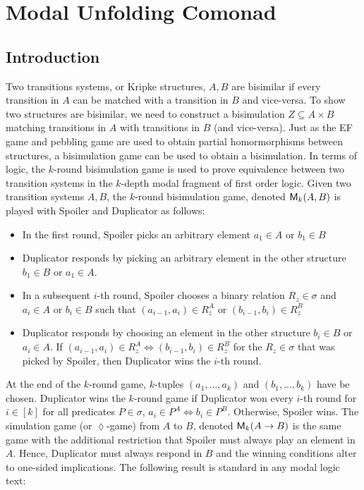 \chapter{Modal Unfolding Comonad}
\section{Introduction}
Two transitions systems, or Kripke structures, $A,B$ are bisimilar if every transition in $A$ can be matched with a transition in $B$ and vice-versa. To show two structures are bisimilar, we need to construct a bisimulation $Z \subseteq A \times B$ matching transitions in $A$ with transitions in $B$ (and vice-versa). Just as the EF game and pebbling game are used to obtain partial homormorphisms between structures, a bisimulation game can be used to obtain a bisimulation. In terms of logic, the $k$-round bisimulation game is used to prove equivalence between two transition systems in the $k$-depth modal fragment of first order logic. Given two transition systems $A,B$, the $k$-round bisimulation game, denoted ${\mathsf{M}_{k}(A,B)}$ is played with Spoiler and Duplicator as follows: 
\begin{itemize} 
\item In the first round, Spoiler picks an arbitrary element $a_{1} \in A$ or $b_{1} \in B$
\item Duplicator responds by picking an arbitrary element in the other structure $b_{1} \in B$ or $a_{1} \in A$.
\item In a subsequent $i$-th round, Spoiler chooses a binary relation $R_{z} \in \sigma$ and $a_{i} \in A$ or $b_{i} \in B$ such that $(a_{i-1},a_{i}) \in R_{z}^{A}$ or $(b_{i-1},b_{i}) \in R_{z}^{B}$
\item Duplicator responds by choosing an element in the other structure $b_{i} \in B$ or $a_{i} \in A$. If $(a_{i-1},a_{i}) \in R_{z}^{A} \Leftrightarrow (b_{i-1},b_{i}) \in R_{z}^{B}$ for the $R_{z} \in \sigma$ that was picked by Spoiler, then Duplicator wins the $i$-th round.  
\end{itemize}
At the end of the $k$-round game, $k$-tuples $(a_{1},\dots,a_{k})$ and $(b_{1},\dots,b_{k})$ have be chosen. Duplicator wins the $k$-round game if Duplicator won every $i$-th round for $i \in [k]$ for all predicates $P \in \sigma$, $a_{i} \in P^{A} \Leftrightarrow b_{i} \in P^{B}$. Otherwise, Spoiler wins. The simulation game (or $\lozenge$-game) from $A$ to $B$, denoted ${\mathsf{M}_{k}(A \rightarrow B)}$ is the same game with the additional restriction that Spoiler must always play an element in $A$. Hence, Duplicator must always respond in $B$ and the winning conditions alter to one-sided implications. The following result is standard in any modal logic text: 
